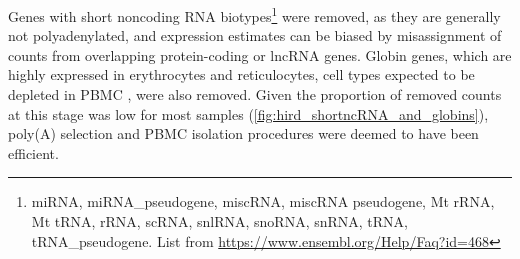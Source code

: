 

Genes with short noncoding RNA biotypes\footnote{miRNA, miRNA\_pseudogene, miscRNA, miscRNA pseudogene, Mt rRNA, Mt tRNA, rRNA, scRNA, snlRNA, snoRNA, snRNA, tRNA, tRNA\_pseudogene. List from \url{https://www.ensembl.org/Help/Faq?id=468}} were removed, as they are generally not polyadenylated, and expression estimates can be biased by misassignment of counts from overlapping protein-coding or lncRNA genes\autocite{zhao2018EvaluationTwoMain}.
Globin genes, which are highly expressed in erythrocytes and reticulocytes, cell types expected to be depleted in \gls{PBMC} \autocite{min2010VariabilityGeneExpression}, were also removed.
Given the proportion of removed counts at this stage was low for most samples (\autoref{fig:hird_shortncRNA_and_globins}), poly(A) selection and \gls{PBMC} isolation procedures were deemed to have been efficient.


